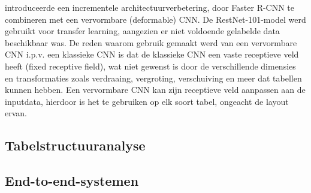 \textcite{Siddiqui2018} introduceerde een incrementele architectuurverbetering, door Faster R-CNN te combineren met een vervormbare (deformable) CNN. De RestNet-101-model werd gebruikt voor transfer learning, aangezien er niet voldoende gelabelde data beschikbaar was. De reden waarom gebruik gemaakt werd van een vervormbare CNN i.p.v. een klassieke CNN is dat de klassieke CNN een vaste receptieve veld heeft (fixed receptive field), wat niet gewenst is door de verschillende dimensies en transformaties zoals verdraaing, vergroting, verschuiving en meer dat tabellen kunnen hebben. Een vervormbare CNN kan zijn receptieve veld aanpassen aan de inputdata, hierdoor is het te gebruiken op elk soort tabel, ongeacht de layout ervan.

\subsection{Tabelstructuuranalyse}
\label{subsec:tabel-structuur-analyse}

\subsection{End-to-end-systemen}
\label{subssec:end-to-end-systemen}
